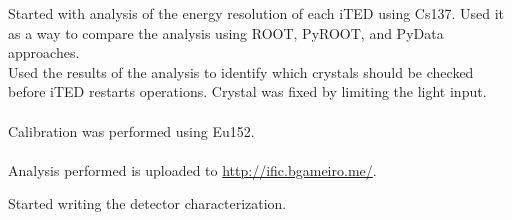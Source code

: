 \begin{minipage}[t][0.45\textheight][t]{0.97\linewidth}
\begin{minipage}[t]{0.49\textwidth}
\begin{minipage}[t][0.22\textheight][t]{\textwidth}
        Started with analysis of the energy resolution of each iTED using Cs137. Used it as a way to compare the analysis using ROOT, PyROOT, and PyData approaches.\\Used the results of the analysis to identify which crystals should be checked before iTED restarts operations. Crystal was fixed by limiting the light input.\\~\\
        Calibration was performed using Eu152.\\~\\
        Analysis performed is uploaded to \url{http://ific.bgameiro.me/}.
    \end{minipage}
    \begin{minipage}[t][0.22\textheight][t]{\textwidth}
        Started writing the detector characterization.
    \end{minipage}
  \end{minipage}  
\end{minipage}

